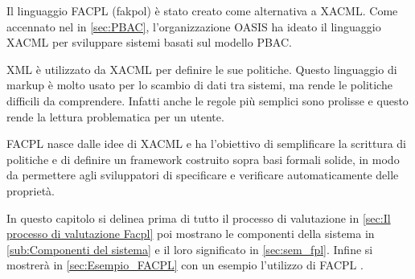 \label{chap:Formal Access Control Policy Language}
Il linguaggio \ac{FACPL} (fakpol) è stato creato come alternativa a \ac{XACML}. Come accennato nel in \ref{sec:PBAC},
l'organizzazione \ac{OASIS} ha ideato il linguaggio XACML per sviluppare sistemi basati sul modello \ac{PBAC}.\par
\ac{XML} è utilizzato da \ac{XACML} per definire le sue politiche. Questo linguaggio di markup è molto usato per lo scambio
di dati tra sistemi, ma rende le politiche difficili da comprendere. Infatti anche le regole più semplici sono prolisse
e questo rende la lettura problematica per un utente.\par
\ac{FACPL} nasce dalle idee di \ac{XACML} e ha l'obiettivo di semplificare la scrittura di politiche e di definire un framework
costruito sopra basi formali solide, in modo da permettere agli sviluppatori di specificare e verificare automaticamente
delle proprietà.

In questo capitolo si delinea prima di tutto il processo di valutazione in \ref{sec:Il processo di valutazione Facpl}
poi mostrano le componenti della sistema in \ref{sub:Componenti del sistema} e il loro significato in \ref{sec:sem_fpl}. Infine si
mostrerà in \ref{sec:Esempio_FACPL} con un esempio l'utilizzo di \ac{FACPL} .

